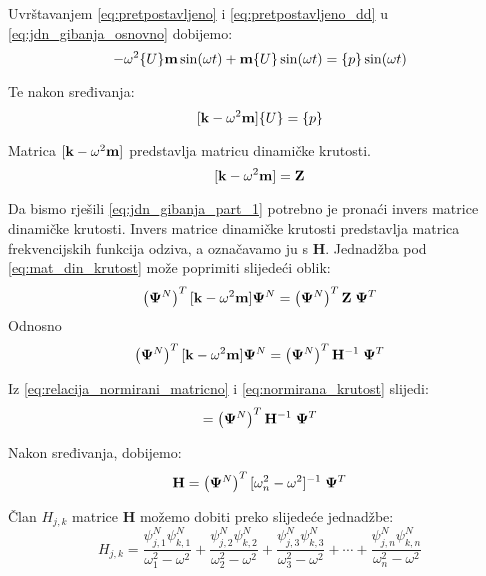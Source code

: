 Uvrštavanjem \eqref{eq:pretpostavljeno} i \eqref{eq:pretpostavljeno_dd} u
\eqref{eq:jdn_gibanja_osnovno} dobijemo:
\begin{equation}
    -\omega^2\{U\}\mathbf{m}\sin(\omega t) + \mathbf{m}\{U\}\sin(\omega t) = \{p\}\sin(\omega t)
\end{equation}

Te nakon sređivanja:
\begin{equation}\label{eq:jdn_gibanja_part_1}
    [\mathbf{k}-\omega^2\mathbf{m}]\{U\}=\{p\}
\end{equation}

Matrica $[\mathbf{k}-\omega^2\mathbf{m}]$ predstavlja matricu dinamičke krutosti.
\begin{equation}\label{eq:mat_din_krutost}
    [\mathbf{k}-\omega^2\mathbf{m}]=\mathbf{Z}
\end{equation}

Da bismo rješili \eqref{eq:jdn_gibanja_part_1} potrebno je pronaći invers matrice
dinamičke krutosti. Invers matrice dinamičke krutosti predstavlja matrica
frekvencijskih funkcija odziva, a označavamo ju s $\mathbf{H}$. Jednadžba pod 
\eqref{eq:mat_din_krutost} može poprimiti slijedeći oblik:
\begin{equation}
    \left(\mathbf{\Psi}^N\right)^T[\mathbf{k}-\omega^2\mathbf{m}]\mathbf{\Psi}^N
    =
    \left(\mathbf{\Psi}^N\right)^T\mathbf{Z}\;\mathbf{\Psi}^T
\end{equation}
Odnosno
\begin{equation}
     \left(\mathbf{\Psi}^N\right)^T[\mathbf{k}-\omega^2\mathbf{m}]\mathbf{\Psi}^N
    =
    \left(\mathbf{\Psi}^N\right)^T\mathbf{H}^{-1}\;\mathbf{\Psi}^T
\end{equation}

Iz \eqref{eq:relacija_normirani_matricno} i \eqref{eq:normirana_krutost} slijedi:
\begin{equation}
    [\omega_n^2 - \omega^2] = \left(\ppsi^N\right)^T\mathbf{H}^{-1}\;\ppsi^T
\end{equation}

Nakon sređivanja, dobijemo:
\begin{equation}
    \mathbf{H}=\left(\mathbf{\Psi}^N\right)^T[\omega_n^2 - \omega^2]^{-1}\;\mathbf{\Psi}^T
\end{equation}

Član $H_{j,k}$ matrice $\mathbf{H}$ možemo dobiti preko slijedeće jednadžbe:
\begin{equation}\label{eq:clan_frf_matrice}
    H_{j,k}=\frac{\psi^N_{j,1}\psi^N_{k,1}}{\omega_1^2-\omega^2}
            +
            \frac{\psi^N_{j,2}\psi^N_{k,2}}{\omega_2^2-\omega^2}
            +
            \frac{\psi^N_{j,3}\psi^N_{k,3}}{\omega_3^2-\omega^2}
            +
            \cdots
            +
            \frac{\psi^N_{j,n}\psi^N_{k,n}}{\omega_n^2-\omega^2}
\end{equation}

